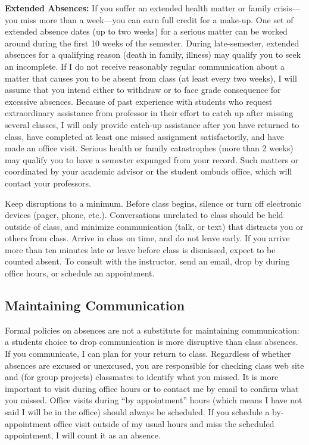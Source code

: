 \documentclass[]{article}
\begin{document}
\textbf{Extended Absences:} If you suffer an extended health matter or
family crisis---you miss more than a week---you can earn full credit for
a make-up. One set of extended absence dates (up to two weeks) for a
serious matter can be worked around during the first 10 weeks of the
semester. During late-semester, extended absences for a qualifying
reason (death in family, illness) may qualify you to seek an incomplete.
If I do not receive reasonably regular communication about a matter that
causes you to be absent from class (at least every two weeks), I will
assume that you intend either to withdraw or to face grade consequence
for excessive absences. Because of past experience with students who
request extraordinary assistance from professor in their effort to catch
up after missing several classes, I will only provide catch-up
assistance after you have returned to class, have completed at least one
missed assignment satisfactorily, and have made an office visit. Serious
health or family catastrophes (more than 2 weeks) may qualify you to
have a semester expunged from your record. Such matters or coordinated
by your academic advisor or the student ombuds office, which will
contact your professors.

Keep disruptions to a minimum. Before class begins, silence or turn off
electronic devices (pager, phone, etc.). Conversations unrelated to
class should be held outside of class, and minimize communication (talk,
or text) that distracts you or others from class. Arrive in class on
time, and do not leave early. If you arrive more than ten minutes late
or leave before class is dismissed, expect to be counted absent. To
consult with the instructor, send an email, drop by during office hours,
or schedule an appointment.

\subsection{Maintaining Communication}\label{maintaining-communication}

Formal policies on absences are not a substitute for maintaining
communication: a students choice to drop communication is more
disruptive than class absences. If you communicate, I can plan for your
return to class. Regardless of whether absences are excused or
unexcused, you are responsible for checking class web site and (for
group projects) classmates to identify what you missed. It is more
important to visit during office hours or to contact me by email to
confirm what you missed. Office visits during ``by appointment'' hours
(which means I have not said I will be in the office) should always be
scheduled. If you schedule a by-appointment office visit outside of my
usual hours and miss the scheduled appointment, I will count it as an
absence.
\end{document}

